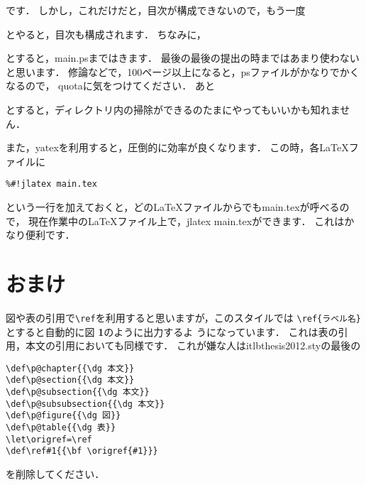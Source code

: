 
です．
しかし，これだけだと，目次が構成できないので，もう一度


とやると，目次も構成されます．
ちなみに，


とすると，main.psまではきます．
最後の最後の提出の時まではあまり使わないと思います．
修論などで，100ページ以上になると，psファイルがかなりでかくなるので，
 quotaに気をつけてください．
あと


とすると，ディレクトリ内の掃除ができるのたまにやってもいいかも知れません．

また，yatexを利用すると，圧倒的に効率が良くなります．
この時，各LaTeXファイルに
\begin{verbatim}
%#!jlatex main.tex	
\end{verbatim}
という一行を加えておくと，どのLaTeXファイルからでもmain.texが呼べるので，
現在作業中のLaTeXファイル上で，jlatex main.texができます．
これはかなり便利です．
\section{おまけ}
図や表の引用で\verb|\ref|を利用すると思いますが，このスタイルでは
\verb|\ref{ラベル名}|とすると自動的に{\gt 図 {\bf 1}}のように出力するよ
うになっています．
これは表の引用，本文の引用においても同様です．
これが嫌な人はitlbthesis2012.styの最後の
\begin{verbatim}
\def\p@chapter{{\dg 本文}}
\def\p@section{{\dg 本文}}
\def\p@subsection{{\dg 本文}}
\def\p@subsubsection{{\dg 本文}}
\def\p@figure{{\dg 図}}
\def\p@table{{\dg 表}}
\let\origref=\ref
\def\ref#1{{\bf \origref{#1}}}
\end{verbatim}
を削除してください．



